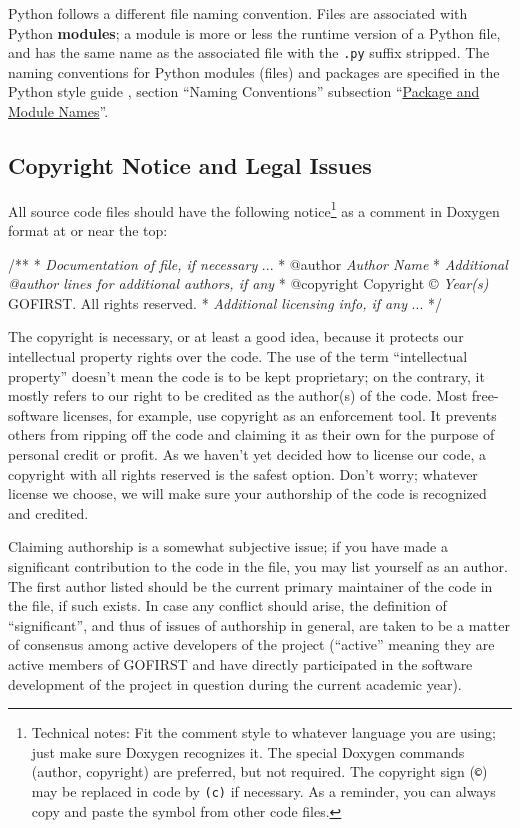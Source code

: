 \documentclass[12pt]{article}
\newcommand{\code}[1]{\texttt{#1}}
\newcommand{\toreplace}[1]{\emph{#1}}
\newcommand{\textdef}[1]{\textbf{#1}}
\begin{document}
Python follows a different file naming convention. Files are associated with Python \textdef{modules}; a module is more or less the runtime version of a Python file, and has the same name as the associated file with the \code{.py} suffix stripped. The naming conventions for Python modules (files) and packages are specified in the Python style guide \cite{pyguide}, section ``Naming Conventions'' subsection ``\href{http://www.python.org/dev/peps/pep-0008/#package-and-module-names}{Package and Module Names}''.

\subsection{Copyright Notice and Legal Issues}
All source code files should have the following notice\footnote{Technical notes: Fit the comment style to whatever language you are using; just make sure Doxygen recognizes it. The special Doxygen commands (author, copyright) are preferred, but not required. The copyright sign (\code{©}) may be replaced in code by \code{(c)} if necessary. As a reminder, you can always copy and paste the symbol from other code files.}
as a comment in Doxygen format at or near the top:
\begin{codeex}[commandchars=\\\{\}]
/**
 * \toreplace{Documentation of file, if necessary}
 ...
 * @author \toreplace{Author Name}
 * \toreplace{Additional @author lines for additional authors, if any}
 * @copyright Copyright © \toreplace{Year(s)} GOFIRST. All rights reserved.
 * \toreplace{Additional licensing info, if any}
 ...
 */
\end{codeex}
The copyright is necessary, or at least a good idea, because it protects our intellectual property rights over the code. The use of the term ``intellectual property'' doesn't mean the code is to be kept proprietary; on the contrary, it mostly refers to our right to be credited as the author(s) of the code. Most free-software licenses, for example, use copyright as an enforcement tool. It prevents others from ripping off the code and claiming it as their own for the purpose of personal credit or profit. As we haven't yet decided how to license our code, a copyright with all rights reserved is the safest option. Don't worry; whatever license we choose, we will make sure your authorship of the code is recognized and credited.

Claiming authorship is a somewhat subjective issue; if you have made a significant contribution to the code in the file, you may list yourself as an author. The first author listed should be the current primary maintainer of the code in the file, if such exists. In case any conflict should arise, the definition of ``significant'', and thus of issues of authorship in general, are taken to be a matter of consensus among active developers of the project (``active'' meaning they are active members of GOFIRST and have directly participated in the software development of the project in question during the current academic year).
\end{document}
